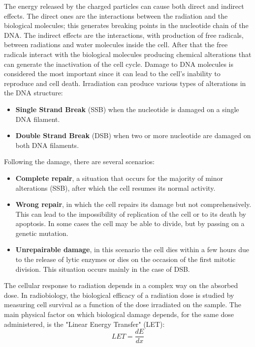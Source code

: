 \noindent The energy released by the charged particles can cause both direct and indirect effects.
The direct ones are the interactions between the radiation and the biological molecules; this generates breaking points in the nucleotide chain of the DNA.
The indirect effects are the interactions, with production of free radicals, between radiations and water molecules inside the cell.
After that the free radicals interact with the biological molecules producing chemical alterations that can generate the inactivation of the cell cycle.
Damage to DNA molecules is considered the most important since it can lead to the cell's inability to reproduce and cell death\cite{cells}.
\newline
Irradiation can produce various types of alterations in the DNA structure:
\begin{itemize}
	\item \textbf{Single Strand Break} (SSB) when the nucleotide is damaged on a single DNA filament.
	\item \textbf{Double Strand Break} (DSB) when two or more nucleotide are damaged on both DNA filaments. 
\end{itemize}
Following the damage, there are several scenarios:
\begin{itemize}
	\item \textbf{Complete repair}, a situation that occurs for the majority of minor alterations (SSB), after which the cell resumes its normal activity.
	\item \textbf{Wrong repair}, in which the cell repairs its damage but not comprehensively. This can lead to the impossibility of replication of the cell or to its death by apoptosis. In some cases the cell may be able to divide, but by passing on a genetic mutation.
	\item \textbf{Unrepairable damage}, in this scenario the cell dies within a few hours due to the release of lytic enzymes or dies on the occasion of the first mitotic division. This situation occurs mainly in the case of DSB.
\end{itemize}
The cellular response to radiation depends in a complex way on the absorbed dose. In radiobiology, the biological efficacy of a radiation dose is studied by measuring cell survival as a function of the dose irradiated on the sample. The main physical factor on which biological damage depends, for the same dose administered, is the "Linear Energy Transfer" (LET)\cite{let}:   
\begin{equation}\label{eq:let}
	LET=\frac{dE}{dx}
\end{equation}
